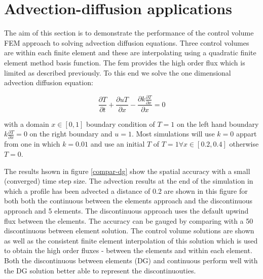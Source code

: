 \pagebreak


\section{Advection-diffusion applications}
\label{Advection-diffusion applications}

The aim of this section is to demonstrate the performance of the
control volume FEM approach to solving advection diffusion equations.
Three control volumes are within each finite element
and these are interpolating using a quadratic finite element
method basis function. The fem provides the high order
flux which is limited as described previously.
To this end we solve the one dimensional advection diffusion equation:

\begin{equation}
\frac{\partial T}{\partial t} + \frac{\partial u T}{\partial x}
- \frac{\partial k \frac{\partial T }{\partial x}}{\partial x} =0
\end{equation}

with a domain $x\in \left[0,1\right]$ boundary condition of $T=1$ on the left hand boundary
$k\frac{\partial T }{\partial x}=0$ on the right boundary and $u=1$.
Most simulations will use $k=0$ appart from one in which $k=0.01$
and use an initial $T$ of $T=1 \forall x\in \left[ 0.2, 0.4 \right]$
otherwise $T=0$.

The results hsown in figure \ref{compar-dg} show the spatial accuracy
with a small (converged) time step size. The advection results at
the end of the simulation in which a profile has been advected a distance
of 0.2 are shown in this figure for both both the continuous between
the elements approach and the discontinuous approach and 5 elements.
The discontinuous approach uses the default upwind flux between
the elements. The accuracy can be gauged by comparing with a 50
discontinuous between element solution.
The control volume solutions are shown as well as the consistent finite
element interpolation of this solution which is used to obtain the
high order fluxes - between the elements and within each element.
Both the discontinuous between elements (DG) and continuous
perform well with the DG solution better able to represent
the discontinuouties.

